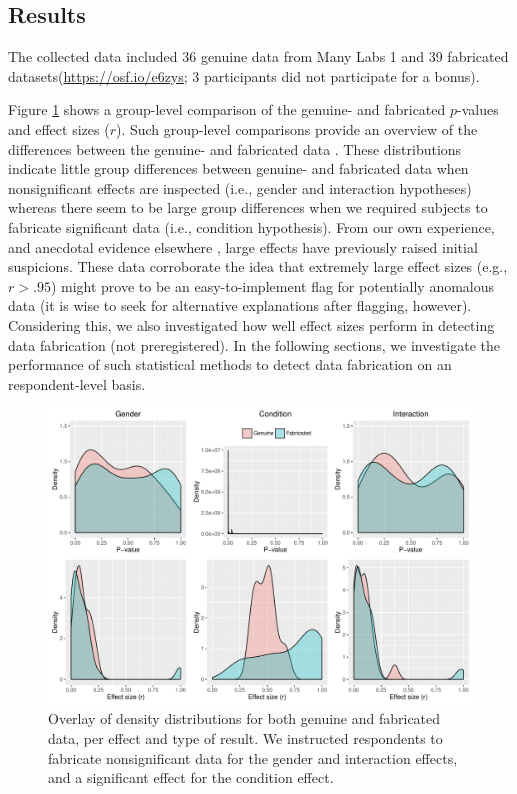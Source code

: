 \documentclass{article}
\begin{document}
\subsection*{Results}


The collected data included 36 genuine data from Many Labs 1 \citep[\url{https://osf.io/pqf9r};][]{klein2014} and 39 fabricated datasets(\url{https://osf.io/e6zys}; 3 participants did not participate for a bonus). 

Figure \ref{densities} shows a group-level comparison of the genuine- and fabricated $p$-values and effect sizes ($r$). Such group-level comparisons provide an overview of the differences between the genuine- and fabricated data \citep[see also][]{Akhtar-Danesh2003}. These distributions indicate little group differences between genuine- and fabricated data when nonsignificant effects are inspected (i.e., gender and interaction hypotheses) whereas there seem to be large group differences when we required subjects to fabricate significant data (i.e., condition hypothesis). From our own experience, and anecdotal evidence elsewhere \citep{BAILEY1991741}, large effects have previously raised initial suspicions. These data corroborate the idea that extremely large effect sizes (e.g., $r>.95$) might prove to be an easy-to-implement flag for potentially anomalous data (it is wise to seek for alternative explanations after flagging, however). Considering this, we also investigated how well effect sizes perform in detecting data fabrication (not preregistered). In the following sections, we investigate the performance of such statistical methods to detect data fabrication on an respondent-level basis.

\begin{figure}[!ht]
\begin{center}
\includegraphics[width=\textwidth,height=\textheight,keepaspectratio]{../figures/ddfab_density.pdf}
\caption{Overlay of density distributions for both genuine and fabricated data, per effect and type of result. We instructed respondents to fabricate nonsignificant data for the gender and interaction effects, and a significant effect for the condition effect.}
\label{densities}
\end{center}
\end{figure}
\end{document}
